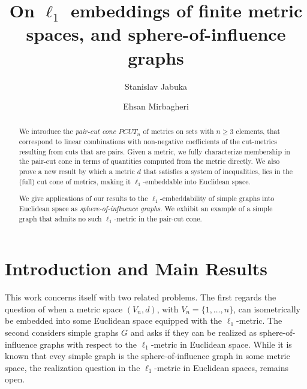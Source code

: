 \documentclass[12pt]{amsart}
\numberwithin{theorem}{section}
\theoremstyle{remark}
\begin{document}
\title[On $\ell_1$ embeddings of finite metric spaces, and SIG graphs]{On $\ell_1$ embeddings of finite metric spaces, and sphere-of-influence graphs}
%
%
%
%
%
%
\begin{abstract}
We introduce the {\em pair-cut cone $PCUT_n$} of metrics on sets with $n\ge 3$ elements, that correspond to linear combinations with non-negative coefficients of the cut-metrics resulting from cuts that are pairs. Given a metric, we fully characterize membership in the pair-cut cone in terms of quantities computed from the metric directly. We also prove a new result by which a metric $d$ that satisfies a system of inequalities, lies in the (full) cut cone of metrics, making it $\ell_1$-embeddable into Euclidean space. 

We give applications of our results to the $\ell_1$-embeddability of simple graphs into Euclidean space as {\em sphere-of-influence graphs}. We exhibit an example of a simple graph that admits no such $\ell_1$-metric in the pair-cut cone.   
\end{abstract}
%
%
\author{Stanislav Jabuka}
\author{Ehsan Mirbagheri} 
\address{Department of Mathematics and Statistics, University of Nevada, Reno NV 89557.}

\maketitle

\section{Introduction and Main Results} 
This work concerns itself with two related problems. The first regards the question of when a metric space $(V_n,d)$, with $V_n = \{1,\dots, n\}$, can isometrically be embedded into some Euclidean space  equipped with the $\ell_1$-metric. The second considers simple graphs $G $ and asks if they can be realized as sphere-of-influence graphs with respect to the $\ell_1$-metric in Euclidean space. While it is known that evey simple graph is the sphere-of-influence graph in some metric space, the realization question in the $\ell_1$-metric in Euclidean spaces, remains open. %
\vskip3mm  
\end{document}
